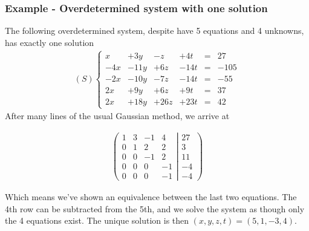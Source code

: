 \documentclass[usenames,dvipsnames,aspectratio=169,10pt]{beamer}
\numberwithin{equation}{section}
\begin{document}
\begin{frame}
\frametitle{Example - Overdetermined system with one solution}
The following overdetermined system, despite have 5 equations and 4 unknowns, has exactly one solution
\begin{align*}
(S)
\left\{
\begin{matrix}
    x &  +3y &   -z &  +4t &=&   27 \\
  -4x & -11y &  +6z & -14t &=& -105 \\
  -2x & -10y &  -7z & -14t &=&  -55 \\
   2x &  +9y &  +6z &  +9t &=&   37 \\
   2x & +18y & +26z & +23t &=&   42
\end{matrix}
\right.
\end{align*}
After many lines of the usual Gaussian method, we arrive at \hspace{-0.3cm}

\begin{minipage}{0.29\textwidth}
\begin{align*}
\left(
	\begin{matrix}
	   1 &   3 &  -1 &   4 \\
	   0 &   1 &   2 &   2 \\
	   0 &   0 &  -1 &   2 \\
	   0 &   0 &   0 & -1 \\
	   0 &   0 &   0 & -1
	\end{matrix}
  \left|
	\begin{matrix}
	    27 \\
	     3 \\
	    11 \\
	    -4 \\
	    -4
	\end{matrix}
  \right.
\right)
\end{align*}
\end{minipage}
\begin{minipage}{0.69\textwidth}
Which means we’ve shown an equivalence between the last two equations. The 4th row
can be subtracted from the 5th, and we solve the system as though only the 4 equations
exist. The unique solution is then $(x,y,z,t)=(5,1,-3,4)$.
\end{minipage}
\end{frame}
\end{document}
